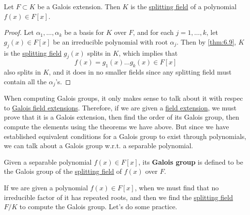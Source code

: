   \begin{theorem}
    \label{thm:every-galois-extension-has-a-splitting-field}
    Let $F \subset K$ be a Galois extension. Then $K$ is the \hyperref[def:splitting-field]{splitting field} of a polynomial $f(x) \in F[x]$. 
  \end{theorem}
  \begin{proof}
    Let $\alpha_1, \ldots, \alpha_k$ be a basis for $K$ over $F$, and for each $j = 1, \ldots, k$, let $g_j (x) \in F[x]$ be an irreducible polynomial with root $\alpha_j$. Then by \ref{thm:6.9}, $K$ is the \hyperref[def:splitting-field]{splitting field} $g_j(x)$ splits in $K$, which implies that 
    \begin{equation}
      f(x) = g_1 (x) \ldots g_k(x) \in F[x]
    \end{equation}
    also splits in $K$, and it does in no smaller fields since any splitting field must contain all the $\alpha_j$'s. 
  \end{proof}

  When computing Galois groups, it only makes sense to talk about it with respec to \hyperref[def:galois-field-extension]{Galois field extensions}. Therefore, if we are given a \hyperref[def:field-extension]{field extension}, we must prove that it is a Galois extension, then find the order of its Galois group, then compute the elements using the theorems we have above. But since we have established equivalent conditions for a Galois group to exist through polynomials, we can talk about a Galois group w.r.t. a separable polynomial. 

  \begin{definition}
    \label{def:galois-group-of-separable-polynomial}
    Given a separable polynomial $f(x) \in F[x]$, its \textbf{Galois group} is defined to be the Galois group of the \hyperref[def:splitting-field]{splitting field} of $f(x)$ over $F$. 
  \end{definition}

  If we are given a polynomial $f(x) \in F[x]$, when we must find that no irreducible factor of it has repeated roots, and then we find the \hyperref[def:splitting-field]{splitting field} $F/K$ to compute the Galois group. Let's do some practice. 

